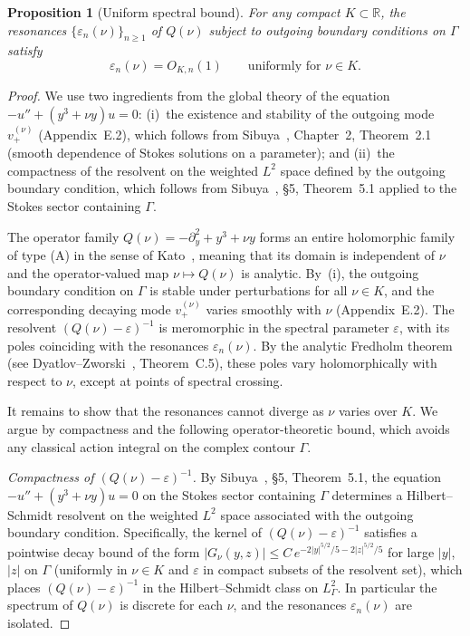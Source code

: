 \documentclass[12pt,a4paper]{amsart}
\newtheorem{proposition}[theorem]{Proposition}
\theoremstyle{remark}
\begin{document}
\begin{proposition}[Uniform spectral bound]
\label{prop:Qnu_O1}
For any compact $K \subset \mathbb{R}$, the resonances
$\{\varepsilon_n(\nu)\}_{n\geq 1}$ of $Q(\nu)$ subject to outgoing boundary
conditions on $\Gamma$ satisfy
\[
  \varepsilon_n(\nu) = O_{K,n}(1)
  \qquad \text{uniformly for } \nu \in K.
\]
\end{proposition}

\begin{proof}
We use two ingredients from the global theory of the equation
$-u'' + (y^3 + \nu y)u = 0$:
(i)~the existence and stability of the outgoing mode $v_+^{(\nu)}$ (Appendix~E.2),
which follows from Sibuya~\cite{Sibuya75}, Chapter~2, Theorem~2.1 (smooth dependence
of Stokes solutions on a parameter); and
(ii)~the compactness of the resolvent on the weighted $L^2$ space defined by
the outgoing boundary condition, which follows from Sibuya~\cite{Sibuya75},
\S5, Theorem~5.1 applied to the Stokes sector containing $\Gamma$.

The operator family $Q(\nu) = -\partial_y^2 + y^3 + \nu y$ forms an entire holomorphic
family of type (A) in the sense of Kato~\cite{Kato66}, meaning that its domain is independent of
$\nu$ and the operator-valued map $\nu \mapsto Q(\nu)$ is analytic.
By~(i), the outgoing boundary condition on $\Gamma$ is stable under perturbations
for all $\nu \in K$, and the corresponding decaying mode $v_+^{(\nu)}$ varies smoothly
with $\nu$ (Appendix~E.2).
The resolvent $(Q(\nu) - \varepsilon)^{-1}$ is meromorphic in the spectral parameter $\varepsilon$, with
its poles coinciding with the resonances $\varepsilon_n(\nu)$. By the analytic Fredholm theorem
(see Dyatlov--Zworski~\cite{DZ19}, Theorem~C.5), these poles vary holomorphically with respect to $\nu$,
except at points of spectral crossing.

It remains to show that the resonances cannot diverge as $\nu$ varies over $K$.
We argue by compactness and the following operator-theoretic bound, which
avoids any classical action integral on the complex contour $\Gamma$.

\emph{Compactness of $(Q(\nu) - \varepsilon)^{-1}$.}
By Sibuya~\cite{Sibuya75}, \S5, Theorem~5.1, the equation
$-u'' + (y^3 + \nu y)u = 0$ on the Stokes sector containing $\Gamma$
determines a Hilbert--Schmidt resolvent on the weighted $L^2$ space
associated with the outgoing boundary condition.
Specifically, the kernel of $(Q(\nu)-\varepsilon)^{-1}$ satisfies a
pointwise decay bound of the form
$|G_\nu(y,z)| \leq C\,e^{-2|y|^{5/2}/5 - 2|z|^{5/2}/5}$ for large
$|y|$, $|z|$ on $\Gamma$ (uniformly in $\nu \in K$ and $\varepsilon$
in compact subsets of the resolvent set), which places
$(Q(\nu)-\varepsilon)^{-1}$ in the Hilbert--Schmidt class on
$L^2_\Gamma$. In particular the spectrum of $Q(\nu)$ is discrete for
each $\nu$, and the resonances $\varepsilon_n(\nu)$ are isolated.


\end{proof}
\end{document}
